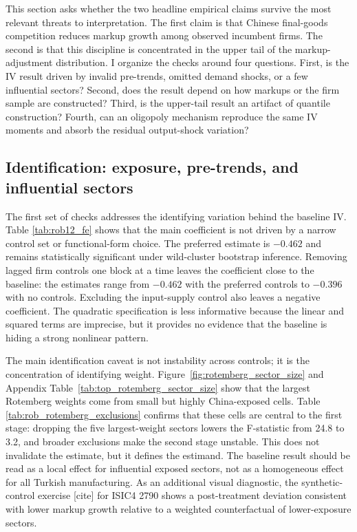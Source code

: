 \documentclass[12pt]{article}
\newcommand{\parencite}[2][]{[cite]}
\begin{document}
This section asks whether the two headline empirical claims survive the most relevant threats to interpretation. The first claim is that Chinese final-goods competition reduces markup growth among observed incumbent firms. The second is that this discipline is concentrated in the upper tail of the markup-adjustment distribution. I organize the checks around four questions. First, is the IV result driven by invalid pre-trends, omitted demand shocks, or a few influential sectors? Second, does the result depend on how markups or the firm sample are constructed? Third, is the upper-tail result an artifact of quantile construction? Fourth, can an oligopoly mechanism reproduce the same IV moments and absorb the residual output-shock variation?

\subsection{Identification: exposure, pre-trends, and influential sectors}

The first set of checks addresses the identifying variation behind the baseline IV. Table \ref{tab:rob12_fe} shows that the main coefficient is not driven by a narrow control set or functional-form choice. The preferred estimate is $-0.462$ and remains statistically significant under wild-cluster bootstrap inference. Removing lagged firm controls one block at a time leaves the coefficient close to the baseline: the estimates range from $-0.462$ with the preferred controls to $-0.396$ with no controls. Excluding the input-supply control also leaves a negative coefficient. The quadratic specification is less informative because the linear and squared terms are imprecise, but it provides no evidence that the baseline is hiding a strong nonlinear pattern.

The main identification caveat is not instability across controls; it is the concentration of identifying weight. Figure~\ref{fig:rotemberg_sector_size} and Appendix Table~\ref{tab:top_rotemberg_sector_size} show that the largest Rotemberg weights come from small but highly China-exposed cells. Table \ref{tab:rob_rotemberg_exclusions} confirms that these cells are central to the first stage: dropping the five largest-weight sectors lowers the F-statistic from 24.8 to 3.2, and broader exclusions make the second stage unstable. This does not invalidate the estimate, but it defines the estimand. The baseline result should be read as a local effect for influential exposed sectors, not as a homogeneous effect for all Turkish manufacturing. As an additional visual diagnostic, the synthetic-control exercise \parencite{abadieUsingSyntheticControls2021} for ISIC4 2790 shows a post-treatment deviation consistent with lower markup growth relative to a weighted counterfactual of lower-exposure sectors.
\end{document}
